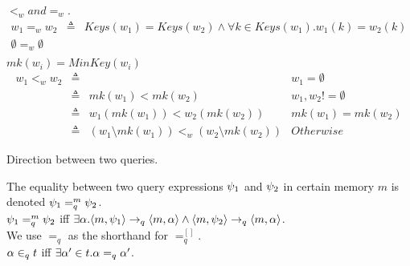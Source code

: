 \documentclass[a4paper,11pt]{article}
\begin{document}
%
\begin{defn}
$<_w and =_w$.\\
\[
  \begin{array}{lll}
     w_1 =_w w_2  &  \triangleq &  Keys(w_1) = Keys(w_2) \land \forall k \in Keys(w_1). w_1(k) = w_2(k) \\
     \emptyset =_w \emptyset & &   \\
  \end{array}
\] 
$mk(w_i) =MinKey(w_i) $ 
\[
\begin{array}{lllr}
     w_1 <_w w_2 & \triangleq & & w_1 = \emptyset \\
     & \triangleq  & mk(w_1) < mk(w_2) & w_1,w_2 != \emptyset  \\
     & \triangleq & w_1(mk(w_1)) < w_2(mk(w_2))   & mk(w_1) = mk(w_2) \\
     & \triangleq & (w_1 \setminus mk(w_1) ) <_w (w_2 \setminus mk(w_2)) & Otherwise
\end{array}
\]
\end{defn}
%
\begin{defn}
\label{def:query_dir}
Direction between two queries.
\\
\end{defn}
% 
%

\begin{defn}
 The equality between two query expressions $\psi_1$ and $\psi_2$ in certain memory $m$ is denoted  $ \psi_1 =_{q}^{m} \psi_2$.\\
$\psi_1 =_{q}^{m} \psi_2$ iff $ \exists \alpha. \langle m,  \psi_1 \rangle \rightarrow_q \langle m, \alpha \rangle \land \langle m,  \psi_2  \rangle \rightarrow_q \langle m, \alpha \rangle $. \\
We use $=_{q}$ as the shorthand for $=_{q}^{[]}$.\\
$\alpha \in_q t $ iff $\exists \alpha' \in t. \alpha =_q \alpha'$.
\end{defn}
\end{document}
